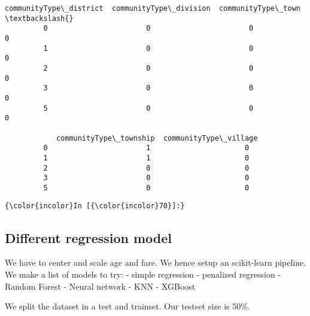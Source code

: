 \documentclass[11pt]{llncs}
\begin{document}
\begin{Verbatim}[commandchars=\\\{\}]
            communityType\_district  communityType\_division  communityType\_town  \textbackslash{}
         0                       0                       0                   0   
         1                       0                       0                   0   
         2                       0                       0                   0   
         3                       0                       0                   0   
         5                       0                       0                   0   
         
            communityType\_township  communityType\_village  
         0                       1                      0  
         1                       1                      0  
         2                       0                      0  
         3                       0                      0  
         5                       0                      0  
\end{Verbatim}
            
    \begin{Verbatim}[commandchars=\\\{\}]
{\color{incolor}In [{\color{incolor}70}]:} 
\end{Verbatim}


    \subsection{Different regression
model}\label{different-regression-model}

    We have to center and scale age and fare. We hence setup an scikit-learn
pipeline. We make a list of models to try: - simple regression -
penalized regression - Random Forest - Neural network - KNN - XGBoost

    We split the dataset in a test and trainset. Our testset size is 50\%.
\end{document}
